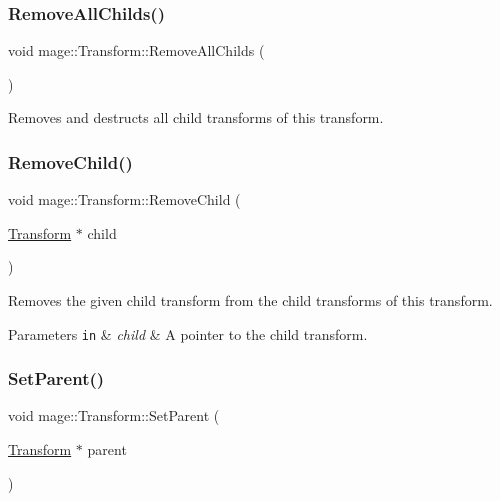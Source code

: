 \subsubsection{\texorpdfstring{Remove\+All\+Childs()}{RemoveAllChilds()}}
{\footnotesize\ttfamily void mage\+::\+Transform\+::\+Remove\+All\+Childs (\begin{DoxyParamCaption}{ }\end{DoxyParamCaption})}

Removes and destructs all child transforms of this transform. \hypertarget{structmage_1_1_transform_ac893db298021d39fd10a42b95d1de14f}{}\label{structmage_1_1_transform_ac893db298021d39fd10a42b95d1de14f} 
\subsubsection{\texorpdfstring{Remove\+Child()}{RemoveChild()}}
{\footnotesize\ttfamily void mage\+::\+Transform\+::\+Remove\+Child (\begin{DoxyParamCaption}\item[{\hyperlink{structmage_1_1_transform}{Transform} $\ast$}]{child }\end{DoxyParamCaption})}

Removes the given child transform from the child transforms of this transform.


\begin{DoxyParams}[1]{Parameters}
\mbox{\tt in}  & {\em child} & A pointer to the child transform. \\
\hline
\end{DoxyParams}
\hypertarget{structmage_1_1_transform_af7eeba5fe16b705b14b85017a5ac0569}{}\label{structmage_1_1_transform_af7eeba5fe16b705b14b85017a5ac0569} 
\subsubsection{\texorpdfstring{Set\+Parent()}{SetParent()}}
{\footnotesize\ttfamily void mage\+::\+Transform\+::\+Set\+Parent (\begin{DoxyParamCaption}\item[{\hyperlink{structmage_1_1_transform}{Transform} $\ast$}]{parent }\end{DoxyParamCaption})\hspace{0.3cm}{\ttfamily [private]}}


